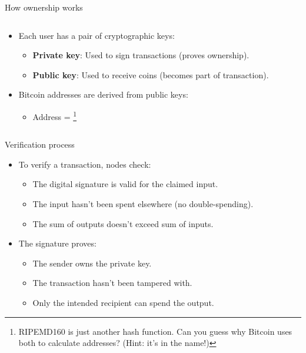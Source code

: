 \documentclass[aspectratio=169, lualatex, handout]{beamer}
\begin{document}
\begin{frame}{How ownership works}
	\begin{columns}[c]
		\begin{column}{1\textwidth}
			\begin{itemize}
				\item Each user has a pair of cryptographic keys:
				      \begin{itemize}
					      \item \textbf{Private key}: Used to sign transactions (proves ownership).
					      \item \textbf{Public key}: Used to receive coins (becomes part of transaction).
				      \end{itemize}
				\item Bitcoin addresses are derived from public keys:
				      \begin{itemize}
					      \item Address = \footnote{RIPEMD160 is just another hash function. Can you guess why Bitcoin uses both to calculate addresses? (Hint: it's in the name!)}
				      \end{itemize}
			\end{itemize}
		\end{column}
	\end{columns}
\end{frame}

\begin{frame}{Verification process}
	\begin{itemize}
		\item To verify a transaction, nodes check:
		      \begin{itemize}
			      \item The digital signature is valid for the claimed input.
			      \item The input hasn't been spent elsewhere (no double-spending).
			      \item The sum of outputs doesn't exceed sum of inputs.
		      \end{itemize}
		\item The signature proves:
		      \begin{itemize}
			      \item The sender owns the private key.
			      \item The transaction hasn't been tampered with.
			      \item Only the intended recipient can spend the output.
		      \end{itemize}
	\end{itemize}
\end{frame}
\end{document}
